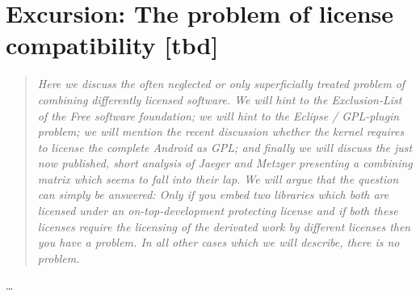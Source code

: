 %
%
%
%
%



\section{Excursion: The problem of license compatibility [tbd]}
\footnotesize
\begin{quote}\itshape
Here we discuss the often neglected or only superficially treated problem of combining
differently licensed software. We will hint to the Exclusion-List of the Free
software foundation; we will hint to the Eclipse / GPL-plugin problem; we will
mention the recent discussion whether the kernel requires to license the
complete Android as GPL; and finally we will discuss the just now published, short
analysis of Jaeger and Metzger presenting a combining matrix which seems to fall
into their lap. %
We will argue that the question can simply be answered:
Only if you embed two libraries which both are licensed under an
on-top-development protecting license and if both these licenses require the
licensing of the derivated work by different licenses then you have a problem.
In all other cases which we will describe, there is no problem.
\end{quote}
\normalsize
\ldots

%
